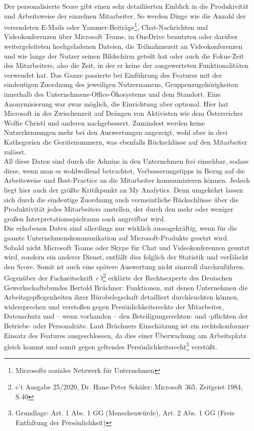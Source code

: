 Der personalisierte Score gibt einen sehr detailiierten Einblick in die Produkivität und Arbeitsweise der einzelnen Mitarbeiter. So werden Dinge wie die Anzahl der versendeten E-Mails oder Yammer-Beiträge\footnote{Microsofts soziales Netzwerk für Unternehmen}, Chat-Nachrichten und Videokonferenzen über Microsoft Teams, in OneDrive benutzten oder  darüber weitergeleiteten hochgeladenen Dateien, die Teilnahmezeit an Videokonferenzen und wie lange der Nutzer seinen Bildschirm geteilt hat oder auch die \glqq Fokus-Zeit\grqq{} des Mitarbeiters, also die Zeit, in der er keine der ausgewerteten Funktionalitäten verwendet hat. Das Ganze passierte bei Einführung des Features mit der eindeutigen Zuordnung des jeweiligen Nutzernamens, Gruppenzugehörigkeiten innerhalb des Unternehmens-Office-Ökosystems und dem Standort. Eine Anonymisierung war zwar möglich, die Einrichtung aber optional. Hier hat Microsoft in der Zwischenzeit auf Drängen von Aktivisten wie dem Österreicher Wolfie Christl und anderen nachgebessert. Zumindest werden keine Nutzerkennungen mehr bei den Auswertungen angezeigt, wohl aber in drei Kathegorien die Gerätenummern, was ebenfalls Rückschlüsse auf den Mitarbeiter zulässt.\\

All diese Daten sind durch die Admins in den Unternehmen frei einsehbar, sodass diese, wenn man es wohlwollend betrachtet, Verbesserungstipps in Bezug auf die Arbeitsweise und Best-Practice an die Mitarbeiter kommunizieren können. Jedoch liegt hier auch der größte Kritikpunkt an My Analytics. Denn umgekehrt lassen sich durch die eindeutige Zuordnung auch vermeintliche Rückschlüsse über die Produktivität jedes Mitarbeiters anstellen, der durch den mehr oder weniger großen Interpretationsspielraum auch angreifbar wird.\\
Die erhobenen Daten sind allerdings nur wirklich aussagekräftig, wenn für die gsamte Unternehmenskommunikation auf Microsoft-Produkte gesetzt wird. Sobald nicht Microsoft Teams oder Skype für Chat und Videokonferenzen genutzt wird, sondern ein anderer Dienst, entfällt dies folglich der Statistik und verfälscht den Score. Somit ist auch eine spätere Auswertung nicht sinnvoll durchzuführen.\\

Gegenüber der Fachzeitschrift \textit{c't}\footnote[1]{c't Ausgabe 25/2020, Dr. Hans-Peter Schüler: \glqq Microsoft 365, Zeitgeist 1984\grqq{}, S.40} erklärte der Rechtsexperte des Deutschen Gewerkschaftsbundes Bertold Brüchner: \glqq Funktionen, mit denen Unternehmen die Arbeitsgepflogenheiten ihrer Bürobelegschaft detailliert durchleuchten können, widersprechen und verstoßen gegen Persönlichkeitsrechte der Mitarbeiter, Datenschutz und – wenn vorhanden – den Beteiligungsrechten- und -pflichten der Betriebs- oder Personalräte.\grqq{} Laut Brüchners Einschätzung ist ein rechtskonformer Einsatz des Features ausgeschlossen, da dies einer Überwachung am Arbeitsplatz gleich kommt und somit gegen geltendes Persönlichkeitsrecht\footnote{Grundlage: Art. 1 Abs. 1 GG (Menschenwürde), Art. 2 Abs. 1 GG (Freie Entfaltung der Persönlichkeit)} verstößt.\\

\vfill